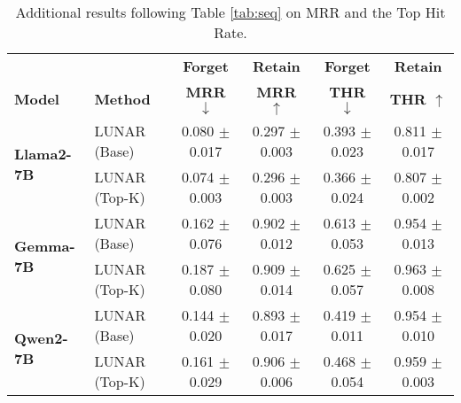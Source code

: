 

\begin{table}[h!]
\centering
\captionsetup{font=small,labelfont=bf}
\caption{Additional results following Table \ref{tab:seq} on MRR and the Top Hit Rate. }
\begin{tabular}{@{}ll|cccc@{}}
\toprule
 && \textbf{Forget} & \textbf{Retain} & \textbf{Forget} & \textbf{Retain} \\
\textbf{Model}   & \textbf{Method}     & \textbf{MRR $\downarrow$}  & \textbf{MRR $\uparrow$} & \textbf{THR $\downarrow$} &\textbf{THR $\uparrow$}  \\ \midrule
\multirow{2}{*}{\textbf{Llama2-7B}} 
    & LUNAR (Base)   & 0.080 $\pm$ 0.017 & 0.297 $\pm$ 0.003 & 0.393 $\pm$ 0.023 & 0.811 $\pm$ 0.017 \\
    & LUNAR (Top-K)  & 0.074 $\pm$ 0.003 & 0.296 $\pm$ 0.003 & 0.366 $\pm$ 0.024 & 0.807 $\pm$ 0.002 \\ \midrule
\multirow{2}{*}{\textbf{Gemma-7B}} 
    & LUNAR (Base)   & 0.162 $\pm$ 0.076 & 0.902 $\pm$ 0.012 & 0.613 $\pm$ 0.053 & 0.954 $\pm$ 0.013 \\
    & LUNAR (Top-K)  & 0.187 $\pm$ 0.080 & 0.909 $\pm$ 0.014 & 0.625 $\pm$ 0.057 & 0.963 $\pm$ 0.008 \\ \midrule
\multirow{2}{*}{\textbf{Qwen2-7B}} 
    & LUNAR (Base)   & 0.144 $\pm$ 0.020 & 0.893 $\pm$ 0.017 & 0.419 $\pm$ 0.011 & 0.954 $\pm$ 0.010 \\
    & LUNAR (Top-K)  & 0.161 $\pm$ 0.029 & 0.906 $\pm$ 0.006 & 0.468 $\pm$ 0.054 & 0.959 $\pm$ 0.003 \\ \bottomrule
\end{tabular}
\label{tab:evaluation_metrics}
\end{table}